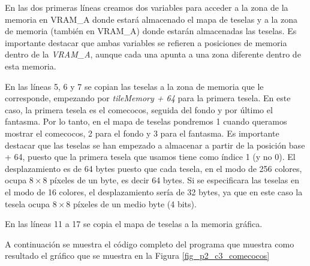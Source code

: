 En las dos primeras líneas creamos dos variables para acceder a la zona de la memoria en VRAM\_A donde estará almacenado el mapa de teselas y a la zona de memoria (también en VRAM\_A) donde estarán almacenadas las teselas. Es importante destacar que ambas variables se refieren a posiciones de memoria dentro de la \textit{VRAM\_A}, aunque cada una apunta a una zona diferente dentro de esta memoria.

En las líneas 5, 6 y 7 se copian las teselas a la zona de memoria que le corresponde, empezando por \textit{tileMemory + 64} para la primera tesela. En este caso, la primera tesela es el comecocos, seguida del fondo y por último el fantasma. Por lo tanto, en el mapa de teselas pondremos 1 cuando queramos mostrar el comecocos, 2 para el fondo y 3 para el fantasma. Es importante destacar que las teselas se han empezado a almacenar a partir de la posición base + 64, puesto que la primera tesela que usamos tiene como índice 1 (y no 0). El desplazamiento es de 64 bytes puesto que cada tesela, en el modo de 256 colores, ocupa $8\times8$ píxeles de un byte, es decir 64 bytes. Si se especificara las teselas en el modo de 16 colores, el desplazamiento sería de 32 bytes, ya que en este caso la tesela ocupa $8\times8$ píxeles de un medio byte (4 bits).

En las líneas 11 a 17 se copia el mapa de teselas a la memoria gráfica.

A continuación se muestra el código completo del programa que muestra como resultado el gráfico que se muestra en la Figura \ref{fig_p2_c3_comecocos}

